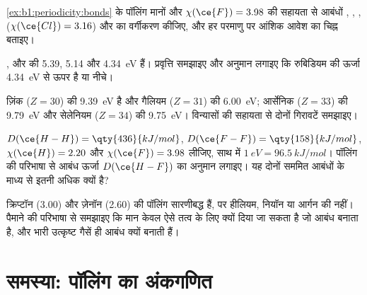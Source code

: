 \begin{exercise}[$\star\star$]\label{exo:b1:periodicity:8}
\cref{ex:b1:periodicity:bonds} के पॉलिंग मानों और $\chi(\ce{F})
= 3.98$ की सहायता से आबंधों , , , 
($\chi(\ce{Cl}) = 3.16$) और  का वर्गीकरण कीजिए, और हर परमाणु पर
आंशिक आवेश का चिह्न बताइए।
\end{exercise}

\begin{exercise}[$\star\star$]\label{exo:b1:periodicity:9}
,  और  की  5.39,
5.14 और \qty{4.34}{eV} हैं। प्रवृत्ति समझाइए और अनुमान लगाइए कि
रुबिडियम की ऊर्जा \qty{4.34}{eV} से ऊपर है या नीचे।
\end{exercise}

\begin{exercise}[$\star\star\star$]\label{exo:b1:periodicity:10}
ज़िंक ($Z = 30$) की  \qty{9.39}{eV} है और
गैलियम ($Z = 31$) की \qty{6.00}{eV}; आर्सेनिक ($Z = 33$) की \qty{9.79}{eV}
और सेलेनियम ($Z = 34$) की \qty{9.75}{eV}। विन्यासों की सहायता से दोनों गिरावटें
समझाइए।
\end{exercise}

\begin{exercise}[$\star\star\star$]\label{exo:b1:periodicity:11}
$D(\ce{H-H}) = \qty{436}{kJ/mol}$, $D(\ce{F-F}) =
\qty{158}{kJ/mol}$, $\chi(\ce{H}) = 2.20$ और $\chi(\ce{F}) = 3.98$ लीजिए, साथ में
$\qty{1}{eV} = \qty{96.5}{kJ/mol}$। पॉलिंग की परिभाषा से
आबंध ऊर्जा $D(\ce{H-F})$ का अनुमान लगाइए। यह दोनों सममित आबंधों के माध्य से
इतनी अधिक क्यों है?
\end{exercise}

\begin{exercise}[$\star\star\star$]\label{exo:b1:periodicity:12}
क्रिप्टॉन (3.00) और ज़ेनॉन (2.60) की पॉलिंग  सारणीबद्ध हैं,
पर हीलियम, नियॉन या आर्गन की नहीं। पैमाने की परिभाषा
से समझाइए कि मान केवल ऐसे तत्व के लिए क्यों दिया जा सकता है जो आबंध
बनाता है, और भारी उत्कृष्ट गैसें ही आबंध क्यों बनाती हैं।
\end{exercise}

\section{समस्या: पॉलिंग का अंकगणित}


